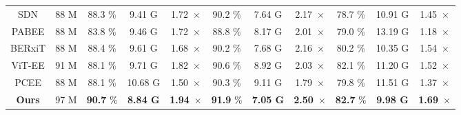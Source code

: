 \begin{table*}
\begin{tabular}{c|c|ccc|ccc|ccc}
  \hline
  SDN                                             & 88 M                                & 88.3 \%          & 9.41 G                     & 1.72~$\times$                & 90.2 \%          & 7.64 G                     & 2.17~$\times$                & 78.7 \%          & 10.91 G                    & 1.45~$\times$                 \\
  PABEE                                           & 88 M                                & 83.8 \%          & 9.46 G                     & 1.72~$\times$                & 88.8 \%          & 8.17 G                     & 2.01~$\times$                & 79.0 \%          & 13.19 G                    & 1.18~$\times$                 \\
  BERxiT                                          & 88 M                                & 88.4 \%          & 9.61 G                     & 1.68~$\times$                & 90.2 \%          & 7.68 G                     & 2.16~$\times$                & 80.2 \%          & 10.35 G                    & 1.54~$\times$                 \\
  ViT-EE                                          & 91 M                                & 88.1 \%          & 9.71 G                     & 1.82~$\times$                & 90.6 \%          & 8.92 G                     & 2.03~$\times$                & 82.1 \%          & 11.20 G                    & 1.52~$\times$                 \\
  PCEE                                            & 88 M                                & 88.1 \%          & 10.68 G                    & 1.50~$\times$                & 90.3 \%          & 9.11 G                     & 1.79~$\times$                & 79.8 \%          & 11.51 G                    & 1.37~$\times$                 \\
  \rowcolor[rgb]{0.949,0.949,0.949} \textbf{Ours} & 97 M                                & \textbf{90.7} \% & \textbf{8.84 G}            & \textbf{1.94}~$\times$       & \textbf{91.9} \% & \textbf{7.05 G}            & \textbf{2.50}~$\times$       & \textbf{82.7} \% & \textbf{9.98 G}            & \textbf{1.69}~$\times$        \\
  \bottomrule
  \end{tabular}
  \vspace{-7pt}
  \end{table*}